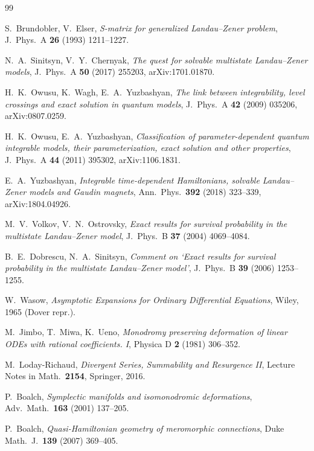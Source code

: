 \documentclass[11pt]{article}
\theoremstyle{definition}
\theoremstyle{remark}
\begin{document}
\begin{thebibliography}{99}

 S.~Brundobler, V.~Elser, \emph{S-matrix for generalized Landau--Zener
problem}, J.\ Phys.\ A \textbf{26} (1993) 1211--1227.

 N.~A.~Sinitsyn, V.~Y.~Chernyak, \emph{The quest for solvable multistate
Landau--Zener models}, J.\ Phys.\ A \textbf{50} (2017) 255203, arXiv:1701.01870.

 H.~K.~Owusu, K.~Wagh, E.~A.~Yuzbashyan, \emph{The link between integrability,
level crossings and exact solution in quantum models}, J.\ Phys.\ A \textbf{42} (2009)
035206, arXiv:0807.0259.

 H.~K.~Owusu, E.~A.~Yuzbashyan, \emph{Classification of parameter-dependent
quantum integrable models, their parameterization, exact solution and other properties},
J.\ Phys.\ A \textbf{44} (2011) 395302, arXiv:1106.1831.

 E.~A.~Yuzbashyan, \emph{Integrable time-dependent Hamiltonians, solvable
Landau--Zener models and Gaudin magnets}, Ann.\ Phys.\ \textbf{392} (2018) 323--339,
arXiv:1804.04926.

 M.~V.~Volkov, V.~N.~Ostrovsky, \emph{Exact results for survival probability
in the multistate Landau--Zener model}, J.\ Phys.\ B \textbf{37} (2004) 4069--4084.

 B.~E.~Dobrescu, N.~A.~Sinitsyn, \emph{Comment on `Exact results for survival
probability in the multistate Landau--Zener model'}, J.\ Phys.\ B \textbf{39} (2006)
1253--1255.

 W.~Wasow, \emph{Asymptotic Expansions for Ordinary Differential
Equations}, Wiley, 1965 (Dover repr.).

 M.~Jimbo, T.~Miwa, K.~Ueno, \emph{Monodromy preserving deformation of
linear ODEs with rational coefficients. I}, Physica D \textbf{2} (1981) 306--352.

 M.~Loday-Richaud, \emph{Divergent Series, Summability and Resurgence II},
Lecture Notes in Math.\ \textbf{2154}, Springer, 2016.

 P.~Boalch, \emph{Symplectic manifolds and isomonodromic deformations},
Adv.\ Math.\ \textbf{163} (2001) 137--205.

 P.~Boalch, \emph{Quasi-Hamiltonian geometry of meromorphic connections},
Duke Math.\ J.\ \textbf{139} (2007) 369--405.


\end{thebibliography}
\end{document}
